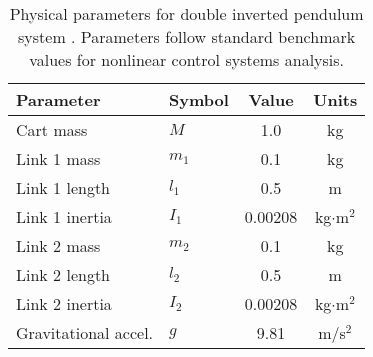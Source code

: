 \begin{table}[h]
\centering
\caption{Physical parameters for double inverted pendulum system \cite{khalil2002nonlinear,slotine1991applied,chen1999linear,lee2020robust,astrom2021feedback,franklin2019feedback}. Parameters follow standard benchmark values for nonlinear control systems analysis.}
\label{tab:physical_params}
\begin{tabular}{llcc}
\hline
\textbf{Parameter} & \textbf{Symbol} & \textbf{Value} & \textbf{Units} \\
\hline
Cart mass & $M$ & 1.0 & kg \\
Link 1 mass & $m_1$ & 0.1 & kg \\
Link 1 length & $l_1$ & 0.5 & m \\
Link 1 inertia & $I_1$ & 0.00208 & kg$\cdot$m$^2$ \\
Link 2 mass & $m_2$ & 0.1 & kg \\
Link 2 length & $l_2$ & 0.5 & m \\
Link 2 inertia & $I_2$ & 0.00208 & kg$\cdot$m$^2$ \\
Gravitational accel. & $g$ & 9.81 & m/s$^2$ \\
\hline
\end{tabular}
\end{table}
